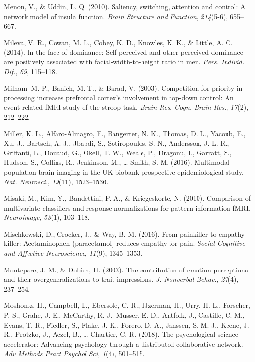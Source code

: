 \documentclass[11pt,american,]{memoir} %
\begin{document}
\leavevmode\hypertarget{ref-menon2010saliency}{}%
Menon, V., \& Uddin, L. Q. (2010). Saliency, switching, attention and control: A network model of insula function. \emph{Brain Structure and Function}, \emph{214}(5-6), 655--667.

\leavevmode\hypertarget{ref-Mileva2014-ld}{}%
Mileva, V. R., Cowan, M. L., Cobey, K. D., Knowles, K. K., \& Little, A. C. (2014). In the face of dominance: Self-perceived and other-perceived dominance are positively associated with facial-width-to-height ratio in men. \emph{Pers. Individ. Dif.}, \emph{69}, 115--118.

\leavevmode\hypertarget{ref-Milham2003-zc}{}%
Milham, M. P., Banich, M. T., \& Barad, V. (2003). Competition for priority in processing increases prefrontal cortex's involvement in top-down control: An event-related fMRI study of the stroop task. \emph{Brain Res. Cogn. Brain Res.}, \emph{17}(2), 212--222.

\leavevmode\hypertarget{ref-Miller2016-oi}{}%
Miller, K. L., Alfaro-Almagro, F., Bangerter, N. K., Thomas, D. L., Yacoub, E., Xu, J., Bartsch, A. J., Jbabdi, S., Sotiropoulos, S. N., Andersson, J. L. R., Griffanti, L., Douaud, G., Okell, T. W., Weale, P., Dragonu, I., Garratt, S., Hudson, S., Collins, R., Jenkinson, M., \ldots{} Smith, S. M. (2016). Multimodal population brain imaging in the UK biobank prospective epidemiological study. \emph{Nat. Neurosci.}, \emph{19}(11), 1523--1536.

\leavevmode\hypertarget{ref-misaki2010comparison}{}%
Misaki, M., Kim, Y., Bandettini, P. A., \& Kriegeskorte, N. (2010). Comparison of multivariate classifiers and response normalizations for pattern-information fMRI. \emph{Neuroimage}, \emph{53}(1), 103--118.

\leavevmode\hypertarget{ref-mischkowski2016painkiller}{}%
Mischkowski, D., Crocker, J., \& Way, B. M. (2016). From painkiller to empathy killer: Acetaminophen (paracetamol) reduces empathy for pain. \emph{Social Cognitive and Affective Neuroscience}, \emph{11}(9), 1345--1353.

\leavevmode\hypertarget{ref-Montepare2003-hy}{}%
Montepare, J. M., \& Dobish, H. (2003). The contribution of emotion perceptions and their overgeneralizations to trait impressions. \emph{J. Nonverbal Behav.}, \emph{27}(4), 237--254.

\leavevmode\hypertarget{ref-Moshontz2018-rc}{}%
Moshontz, H., Campbell, L., Ebersole, C. R., IJzerman, H., Urry, H. L., Forscher, P. S., Grahe, J. E., McCarthy, R. J., Musser, E. D., Antfolk, J., Castille, C. M., Evans, T. R., Fiedler, S., Flake, J. K., Forero, D. A., Janssen, S. M. J., Keene, J. R., Protzko, J., Aczel, B., \ldots{} Chartier, C. R. (2018). The psychological science accelerator: Advancing psychology through a distributed collaborative network. \emph{Adv Methods Pract Psychol Sci}, \emph{1}(4), 501--515.
\end{document}
